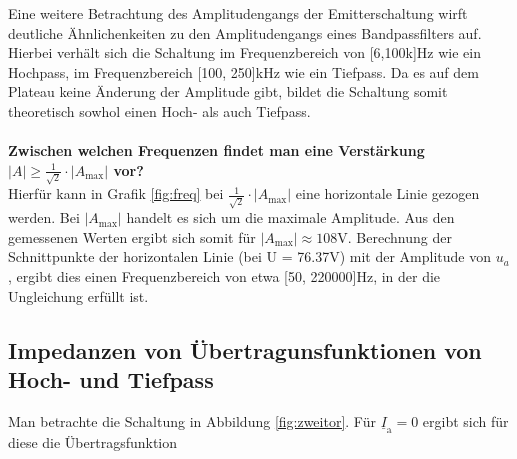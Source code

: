 \documentclass[a4paper,usenatbib]{aspdoc}
\begin{document}
            Eine weitere Betrachtung des Amplitudengangs der Emitterschaltung wirft deutliche Ähnlichenkeiten zu den Amplitudengangs eines Bandpassfilters auf. Hierbei verhält sich die Schaltung im Frequenzbereich von [6,100k]Hz wie ein Hochpass, im Frequenzbereich [100, 250]kHz wie ein Tiefpass. Da es auf dem Plateau keine Änderung der Amplitude gibt, bildet die Schaltung somit theoretisch sowhol einen Hoch- als auch Tiefpass.\\
            \\
            \textbf{Zwischen welchen Frequenzen findet man eine Verstärkung $|A| \geq \frac{1}{\sqrt{2}} \cdot\left|A_{\max }\right|$ vor?}\\
            Hierfür kann in Grafik \ref{fig:freq} bei $\frac{1}{\sqrt{2}} \cdot\left|A_{\max }\right|$ eine horizontale Linie gezogen werden. Bei $|A_{\max}|$ handelt es sich um die maximale Amplitude. Aus den gemessenen Werten ergibt sich somit für $|A_{\max}| \approx 108$V. Berechnung der Schnittpunkte der horizontalen Linie (bei U = 76.37V) mit der Amplitude von $u_a$, ergibt dies einen Frequenzbereich von etwa [50, 220000]Hz, in der die Ungleichung erfüllt ist.
            
            
            
        \subsection{Impedanzen von Übertragunsfunktionen von Hoch- und Tiefpass}
            Man betrachte die Schaltung in Abbildung \ref{fig:zweitor}. Für $\underline{I}_{\mathrm{a}}=0$ ergibt sich für diese die Übertragsfunktion
            
\end{document}
